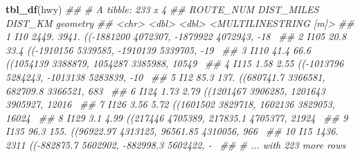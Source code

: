 \documentclass[11pt,ignorenonframetext,]{beamer}
\newenvironment{Shaded}{}{}
\newcommand{\CommentTok}[1]{\textcolor[rgb]{0.38,0.63,0.69}{\textit{#1}}}
\newcommand{\KeywordTok}[1]{\textcolor[rgb]{0.00,0.44,0.13}{\textbf{#1}}}
\newcommand{\NormalTok}[1]{#1}
\let\oldShaded\Shaded
\let\endoldShaded\endShaded
\renewenvironment{Shaded}{\footnotesize\begin{spacing}{0.9}\oldShaded}{\endoldShaded\end{spacing}}
\let\oldverbatim\verbatim
\let\endoldverbatim\endverbatim
\newcommand{\scriptoutput}{
  \renewenvironment{Shaded}{\scriptsize\begin{spacing}{0.9}\oldShaded}{\endoldShaded\end{spacing}}
  \renewenvironment{verbatim}{\scriptsize\begin{spacing}{0.9}\oldverbatim}{\endoldverbatim\end{spacing}}
}
\begin{document}
\begin{frame}[fragile,t]{}
\protect\hypertarget{section-3}{}

\scriptoutput

\begin{Shaded}
\begin{Highlighting}[]
\KeywordTok{tbl_df}\NormalTok{(hwy)}
\CommentTok{## # A tibble: 233 x 4}
\CommentTok{##    ROUTE_NUM DIST_MILES DIST_KM                                   geometry}
\CommentTok{##    <chr>          <dbl>   <dbl>                      <MULTILINESTRING [m]>}
\CommentTok{##  1 I10          2449.   3941.   ((-1881200 4072307, -1879922 4072943, -18~}
\CommentTok{##  2 I105           20.8    33.4  ((-1910156 5339585, -1910139 5339705, -19~}
\CommentTok{##  3 I110           41.4    66.6  ((1054139 3388879, 1054287 3385988, 10549~}
\CommentTok{##  4 I115            1.58    2.55 ((-1013796 5284243, -1013138 5283839, -10~}
\CommentTok{##  5 I12            85.3   137.   ((680741.7 3366581, 682709.8 3366521, 683~}
\CommentTok{##  6 I124            1.73    2.79 ((1201467 3906285, 1201643 3905927, 12016~}
\CommentTok{##  7 I126            3.56    5.72 ((1601502 3829718, 1602136 3829053, 16024~}
\CommentTok{##  8 I129            3.1     4.99 ((217446 4705389, 217835.1 4705377, 21924~}
\CommentTok{##  9 I135           96.3   155.   ((96922.97 4313125, 96561.85 4310056, 966~}
\CommentTok{## 10 I15          1436.   2311    ((-882875.7 5602902, -882998.3 5602422, -~}
\CommentTok{## # ... with 223 more rows}
\end{Highlighting}
\end{Shaded}

\end{frame}
\end{document}
